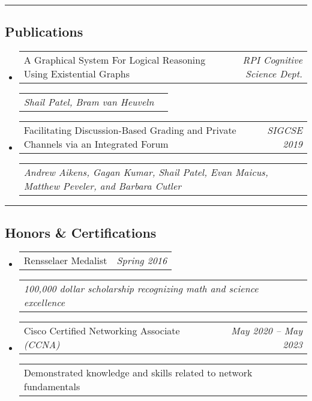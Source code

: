\documentclass[10pt,letterpaper]{article}
\makeatletter
\newcommand{\headerrow}[2]
{\begin{tabular*}{\linewidth}{l@{\extracolsep{\fill}}r}
	#1 &
	#2 \\
\end{tabular*}}
\makeatother
\begin{document}
\hrule
\subsection*{Publications}
\begin{itemize}
	\item
		\headerrow
		{A Graphical System For Logical Reasoning Using Existential Graphs}
		{\emph{RPI Cognitive Science Dept.}}
		\headerrow
		{\emph{Shail Patel, Bram van Heuveln}}
		{}
	\item
		\headerrow
		{Facilitating Discussion-Based Grading and Private Channels via an Integrated Forum}
		{\emph {SIGCSE 2019}}
		\headerrow
		{\emph {Andrew Aikens, Gagan Kumar, Shail Patel, Evan Maicus, Matthew Peveler, and Barbara Cutler}}
		{}
\end{itemize}
\vspace{-0.1em}
\vspace{-0.1em}
\hrule
\vspace{-0.25em}
\subsection*{Honors \& Certifications}
\begin{itemize}
    \item 
        \headerrow
	    {Rensselaer Medalist}
	    {\emph{Spring 2016}}
	    \headerrow
	    {\emph{100,000 dollar scholarship recognizing math and science excellence}}
	    {}
    \item 
        \headerrow
	    {Cisco Certified Networking Associate \emph{(CCNA)}}
	    {\emph{May 2020 -- May 2023}}
	    \headerrow
	    {Demonstrated knowledge and skills related to network fundamentals}
	    {}
\end{itemize}
\end{document}
